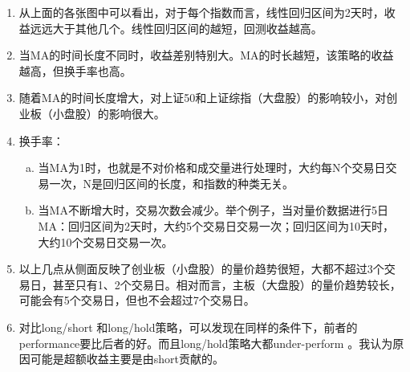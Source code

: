 \documentclass[12pt,a4paper]{article}
\begin{document}
\begin{enumerate}
\item 从上面的各张图中可以看出，对于每个指数而言，线性回归区间为2天时，收益远远大于其他几个。线性回归区间的越短，回测收益越高。
\item 当MA的时间长度不同时，收益差别特别大。MA的时长越短，该策略的收益越高，但换手率也高。
\item 随着MA的时间长度增大，对上证50和上证综指（大盘股）的影响较小，对创业板（小盘股）的影响很大。
\item 换手率：
	\begin{enumerate}[a)]
	\item 当MA为1时，也就是不对价格和成交量进行处理时，大约每N个交易日交易一次，N是回归区间的长度，和指数的种类无关。
	\item 当MA不断增大时，交易次数会减少。举个例子，当对量价数据进行5日MA：回归区间为2天时，大约5个交易日交易一次；回归区间为10天时，大约10个交易日交易一次。
	\end{enumerate}
\item 以上几点从侧面反映了创业板（小盘股）的量价趋势很短，大都不超过3个交易日，甚至只有1、2个交易日。相对而言，主板（大盘股）的量价趋势较长，可能会有5个交易日，但也不会超过7个交易日。
\item  对比long/short 和long/hold策略，可以发现在同样的条件下，前者的performance要比后者的好。而且long/hold策略大都under-perform 。我认为原因可能是超额收益主要是由short贡献的。
\end{enumerate}
\end{document}
